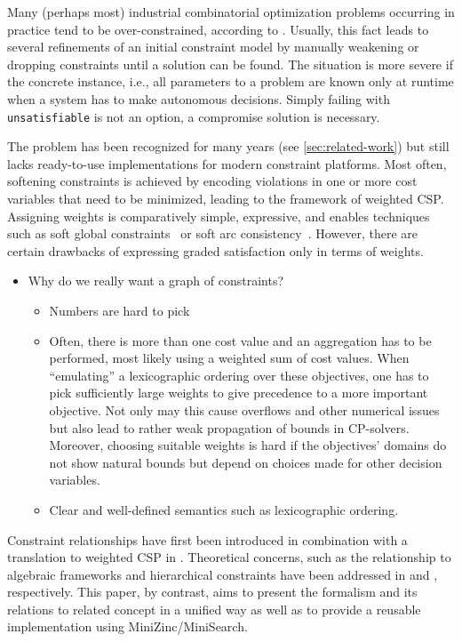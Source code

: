  Many (perhaps most) industrial combinatorial optimization problems occurring in practice
tend to be over-constrained, according to \cite{van2011over}. Usually, this fact leads to several
refinements of an initial constraint model by manually weakening or dropping constraints until a 
solution can be found. The situation is more severe if the concrete 
instance, i.e., all parameters to a problem are known only at runtime when a
system has to make autonomous decisions. Simply failing with \texttt{unsatisfiable} is
not an option, a compromise solution is necessary.

The problem has been recognized for many years (see \cref{sec:related-work}) but still lacks 
ready-to-use implementations for modern constraint platforms. Most often, softening constraints is achieved by encoding violations in one
or more cost variables that need to be minimized, leading to the framework of weighted CSP.
Assigning weights is comparatively simple, expressive, and enables techniques such 
as soft global constraints~\cite{van2011over} or soft arc consistency~\cite{cooper2004arc}. However, there are certain drawbacks of expressing graded satisfaction only
in terms of weights.


\begin{itemize}
\item Why do we really want a graph of constraints?
\begin{itemize}
\item Numbers are hard to pick
\item Often, there is more than one cost value and an aggregation has to be performed, most
likely using a weighted sum of cost values. When ``emulating'' a lexicographic ordering over these objectives, 
one has to pick sufficiently large weights to give precedence to a more important objective.
Not only may this cause overflows and other numerical issues but also lead to
rather weak propagation of bounds in CP-solvers. Moreover, choosing suitable
weights is hard if the objectives' domains do not show natural bounds but depend on choices made for 
other decision variables.

\item Clear and well-defined semantics such as lexicographic ordering.

\end{itemize}
\end{itemize}
Constraint relationships have first been introduced in combination with a translation to weighted CSP in \cite{Schiendorfer13}.
Theoretical concerns, such as the relationship to algebraic frameworks and hierarchical constraints have been addressed 
in \cite{knapp-schiendorfer2014ictai} and \cite{SchiendorferPvs2015}, respectively. This paper, by contrast, 
aims to present the formalism and its relations to related concept in a unified way as well as to provide 
a reusable implementation using MiniZinc/MiniSearch. 
